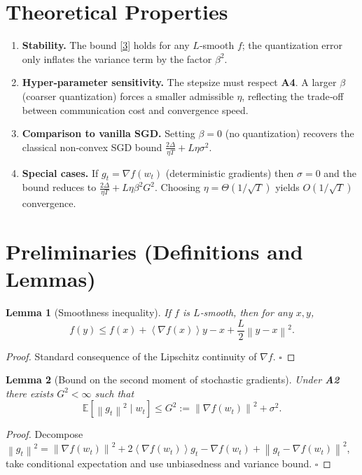 \documentclass{article}
\newtheorem{lemma}{Lemma}
\newcommand{\E}{\mathbb{E}}
\newcommand{\norm}[1]{\left\lVert#1\right\rVert}
\newcommand{\inner}[1]{\left\langle#1\right\rangle}
\begin{document}
\section*{Theoretical Properties}
\begin{enumerate}[label={P\arabic*}:,leftmargin=*,align=left]
\item \textbf{Stability.} The bound \eqref{3} holds for any $L$‑smooth $f$; the quantization error only inflates the variance term by the factor $\beta^{2}$.
\item \textbf{Hyper‑parameter sensitivity.} The stepsize must respect \textbf{A4}. A larger $\beta$ (coarser quantization) forces a smaller admissible $\eta$, reflecting the trade‑off between communication cost and convergence speed.
\item \textbf{Comparison to vanilla SGD.} Setting $\beta=0$ (no quantization) recovers the classical non‑convex SGD bound $\frac{2\Delta}{\eta T}+L\eta\sigma^{2}$.
\item \textbf{Special cases.} If $g_{t}=\nabla f(w_{t})$ (deterministic gradients) then $\sigma=0$ and the bound reduces to $ \frac{2\Delta}{\eta T}+L\eta\beta^{2}G^{2}$. Choosing $\eta = \Theta(1/\sqrt{T})$ yields $O(1/\sqrt{T})$ convergence.
\end{enumerate}

\section*{Preliminaries (Definitions and Lemmas)}
\begin{lemma}[Smoothness inequality]\label{lem:smooth}
If $f$ is $L$‑smooth, then for any $x,y$,
\[
f(y)\le f(x)+\inner{\nabla f(x)}{y-x}+\frac{L}{2}\norm{y-x}^{2}.
\]
\end{lemma}
\begin{proof}
Standard consequence of the Lipschitz continuity of $\nabla f$. $\square$
\end{proof}

\begin{lemma}[Bound on the second moment of stochastic gradients]\label{lem:Gbound}
Under \textbf{A2} there exists $G^{2}<\infty$ such that
\[
\E\!\left[\norm{g_{t}}^{2}\mid w_{t}\right]\le G^{2}:= \norm{\nabla f(w_{t})}^{2}+\sigma^{2}.
\]
\end{lemma}
\begin{proof}
Decompose $\norm{g_{t}}^{2}= \norm{\nabla f(w_{t})}^{2}
+2\inner{\nabla f(w_{t})}{g_{t}-\nabla f(w_{t})}
+\norm{g_{t}-\nabla f(w_{t})}^{2}$,
take conditional expectation and use unbiasedness and variance bound. $\square$
\end{proof}
\end{document}
